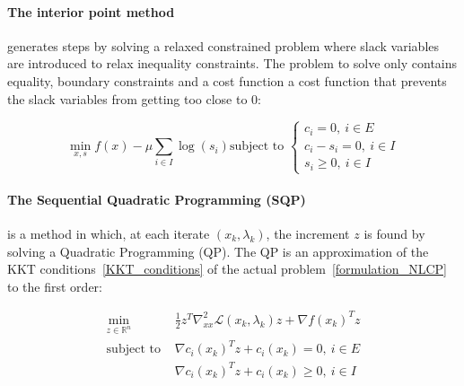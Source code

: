 \paragraph{The interior point method} generates steps by solving a relaxed constrained problem where slack variables are introduced to relax inequality constraints.
The problem to solve only contains equality, boundary constraints and a cost function a cost function that prevents the slack variables from getting too close to 0:

\begin{equation}
  \min_{x,s}{f(x)- \mu\sum_{i\in I} \log(s_i)}
  \text{subject to }
  \left\{
    \begin{array}{l}
     c_i = 0,\ i\in E\\
     c_i - s_i = 0,\ i\in I\\
     s_i \geq 0,\ i\in I
  \end{array}
  \right.
\end{equation}

\paragraph{The Sequential Quadratic Programming (SQP)} is a method in which, at each iterate $(x_k, \lambda_k)$, the increment $z$ is found by solving a Quadratic Programming (QP).
The QP is an approximation of the KKT conditions~\ref{KKT_conditions} of the actual problem~\ref{formulation_NLCP} to the first order:

\begin{equation}
\label{approx_QP}
  \begin{array}{ll}
    \min\limits_{z\in \mathbb{R}^n}{} & \frac{1}{2}z^T \nabla_{xx}^2\mathcal{L}(x_k, \lambda_k)z + \nabla {f(x_k)}^T z \\
    \text{subject to } & {\nabla c_i(x_k)}^T z+c_i(x_k)=0,\ i\in E \\
                       & {\nabla c_i(x_k)}^T z+c_i(x_k)\geq 0,\ i\in I
  \end{array}
\end{equation}

